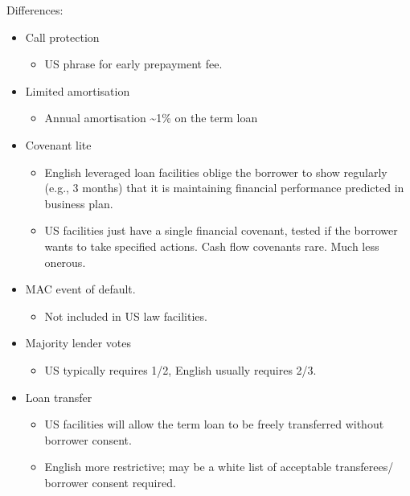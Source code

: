 \documentclass[
]{article}
\providecommand{\tightlist}{%
  \setlength{\itemsep}{0pt}\setlength{\parskip}{0pt}}
\begin{document}
Differences:

\begin{itemize}
\tightlist
\item
  Call protection

  \begin{itemize}
  \tightlist
  \item
    US phrase for early prepayment fee.
  \end{itemize}
\item
  Limited amortisation

  \begin{itemize}
  \tightlist
  \item
    Annual amortisation \textasciitilde1\% on the term loan
  \end{itemize}
\item
  Covenant lite

  \begin{itemize}
  \tightlist
  \item
    English leveraged loan facilities oblige the borrower to show
    regularly (e.g., 3 months) that it is maintaining financial
    performance predicted in business plan.
  \item
    US facilities just have a single financial covenant, tested if the
    borrower wants to take specified actions. Cash flow covenants rare.
    Much less onerous.
  \end{itemize}
\item
  MAC event of default.

  \begin{itemize}
  \tightlist
  \item
    Not included in US law facilities.
  \end{itemize}
\item
  Majority lender votes

  \begin{itemize}
  \tightlist
  \item
    US typically requires 1/2, English usually requires 2/3.
  \end{itemize}
\item
  Loan transfer

  \begin{itemize}
  \tightlist
  \item
    US facilities will allow the term loan to be freely transferred
    without borrower consent.
  \item
    English more restrictive; may be a white list of acceptable
    transferees/ borrower consent required.
  \end{itemize}
\end{itemize}
\end{document}
